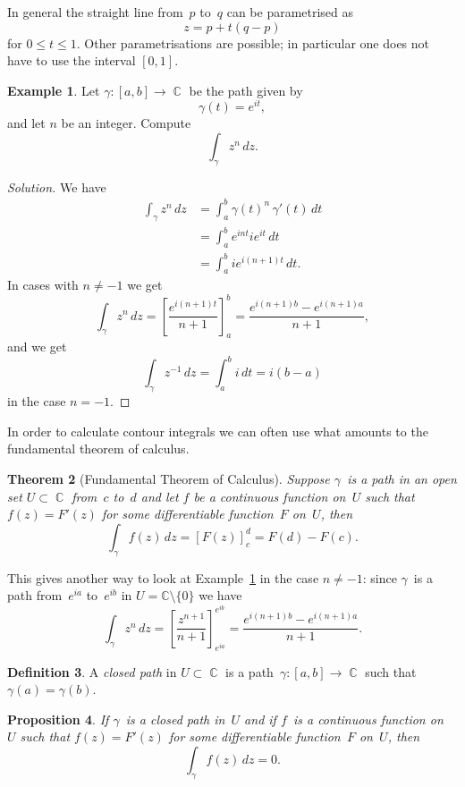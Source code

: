 \documentclass{amsproc}
\newtheorem{theorem}{Theorem}[subsection]
\newtheorem{proposition}[theorem]{Proposition}
\theoremstyle{definition}
\newtheorem{definition}[theorem]{Definition}
\newtheorem{example}[theorem]{Example}
\newenvironment{solution}{\begin{proof}[Solution]}{\end{proof}}
\theoremstyle{remark}
\DeclareMathOperator{\C}{\mathbb{C}}
\numberwithin{equation}{section}
\begin{document}
In general the straight line from~$ p $ to~$ q $ can be parametrised as
$$
z = p + t(q - p)
$$
for $ 0 \leq t \leq 1 $. Other parametrisations are possible; in particular one does not have to use the interval $ [0,1] $.

\begin{example} \label{CME6.8}
Let $ \gamma: [a, b] \to \C $ be the path given by
$$
\gamma(t) = e^{it},
$$
and let $ n $ be an integer. Compute
$$
\int_\gamma z^n\,dz.
$$
\end{example}

\begin{solution}
We have
\begin{align*}
\int_\gamma z^n\,dz &= \int_a^b \gamma(t)^n\,\gamma'(t)\,dt \\
&= \int_a^b e^{int}ie^{it}\,dt \\
&= \int_a^b ie^{i(n + 1)t}\,dt.
\end{align*}
In cases with $ n \neq -1 $ we get
$$
\int_\gamma z^n\,dz = \left[\dfrac{e^{i(n + 1)t}}{n + 1}\right]_a^b = \dfrac{e^{i(n + 1)b} - e^{i(n + 1)a}}{n + 1},
$$
and we get
$$
\int_\gamma z^{-1}\,dz = \int_a^b i\,dt = i(b - a)
$$
in the case $ n = -1 $.
\end{solution}

In order to calculate contour integrals we can often use what amounts to the fundamental theorem of calculus.

\begin{theorem}[Fundamental Theorem of Calculus] \label{CMP6.9}
Suppose $ \gamma $~is a
path in an open set $ U \subset \C $ from~$ c $ to~$ d $ and let $ f $ be a continuous function on~$ U $ such that $ f(z) = F'(z) $
for some differentiable function~$ F $ on~$ U $, then
$$
\int_\gamma f(z)\,dz = [F(z)]_c^d = F(d) - F(c).
$$
\end{theorem}

This gives another way to look at Example~\ref{CME6.8} in the case $ n \neq -1 $: since $ \gamma $~is a path from~$ e^{ia} $ to~$ e^{ib} $ in $ U = \mathbb{C} \setminus \{0\} $
we have
$$
\int_\gamma z^n\,dz = \left[\dfrac{z^{n + 1}}{n + 1}\right]_{e^{ia}}^{e^{ib}} = \dfrac{e^{i(n + 1)b} - e^{i(n + 1)a}}{n + 1}.
$$

\begin{definition} \label{CMD6.10}
A \emph{closed path} in $ U \subset \C $ is a path~$ \gamma: [a,b] \to \C $ such that $ \gamma(a) = \gamma(b) $.
\end{definition}

\begin{proposition} \label{CMP6.11}
If $ \gamma $~is a closed
path in~$ U $ and if $ f $~is a continuous function on~$ U $ such that $ f(z) = F'(z) $ for some differentiable function~$ F $ on~$ U $, then
$$
\int_\gamma f(z)\,dz = 0.
$$
\end{proposition}
\end{document}
